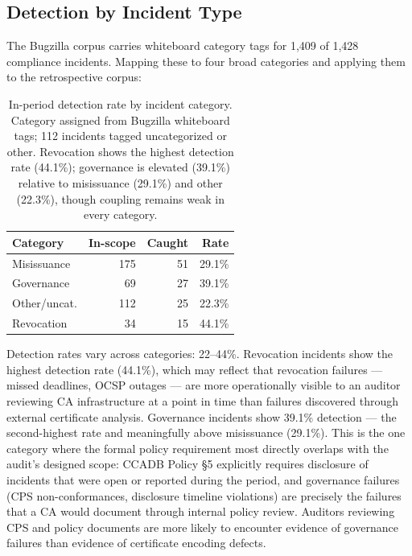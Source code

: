 \documentclass[10pt,twocolumn,letterpaper]{article}
\begin{document}
\subsection{Detection by Incident Type}
\label{sec:detection-type}

The Bugzilla corpus carries whiteboard category tags for 1,409 of 1,428
compliance incidents. Mapping these to four broad categories and applying
them to the retrospective corpus:

\begin{table}[h]
\centering
\footnotesize
\setlength{\tabcolsep}{4pt}
\caption{In-period detection rate by incident category. Category
assigned from Bugzilla whiteboard tags; 112 incidents tagged
uncategorized or other. Revocation shows the highest detection rate (44.1\%);
governance is elevated (39.1\%) relative to misissuance (29.1\%) and other (22.3\%),
though coupling remains weak in every category.}
\label{tab:by-type}
\begin{tabularx}{\columnwidth}{@{}Xrrr@{}}
\toprule
Category & In-scope & Caught & Rate \\
\midrule
Misissuance     & 175 & 51 & 29.1\% \\
Governance      &  69 & 27 & 39.1\% \\
Other/uncat.    & 112 & 25 & 22.3\% \\
Revocation      &  34 & 15 & 44.1\% \\
\bottomrule
\end{tabularx}
\end{table}

Detection rates vary across categories: 22--44\%.
Revocation incidents show the highest detection rate (44.1\%), which
may reflect that revocation failures --- missed deadlines, OCSP
outages --- are more operationally visible to an auditor reviewing
CA infrastructure at a point in time than failures discovered through
external certificate analysis. Governance incidents show 39.1\%
detection --- the second-highest rate and meaningfully above misissuance
(29.1\%). This is the one category where the formal policy requirement
most directly overlaps with the audit's designed scope: CCADB Policy
\S5 explicitly requires disclosure of incidents that were open or
reported during the period, and governance failures (CPS non-conformances,
disclosure timeline violations) are precisely the failures that a CA
would document through internal policy review. Auditors reviewing CPS
and policy documents are more likely to encounter evidence of governance
failures than evidence of certificate encoding defects.
\end{document}
